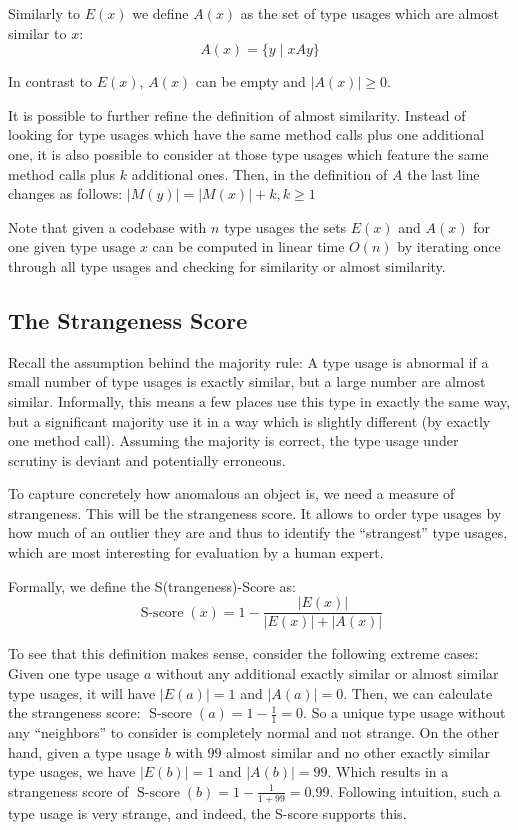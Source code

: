 Similarly to $E(x)$ we define $A(x)$ as the set of type usages which are almost similar to $x$:
\begin{equation*}
A(x) = \{y \mid xAy \}
\end{equation*}

In contrast to $E(x)$, $A(x)$ can be empty and $|A(x)|\geq0$.

It is possible to further refine the definition of almost similarity.
Instead of looking for type usages which have the same method calls plus one additional one, it is also possible to consider at those type usages which feature the same method calls plus $k$ additional ones.
Then, in the definition of $A$ the last line changes as follows: $|M(y)| = |M(x)| + k, k\geq1$

Note that given a codebase with $n$ type usages the sets $E(x)$ and $A(x)$ for one given type usage $x$ can be computed in linear time $O(n)$ by iterating once through all type usages and checking for similarity or almost similarity.

\subsection{The Strangeness Score}

Recall the assumption behind the majority rule: A type usage is abnormal if a small number of type usages is exactly similar, but a large number are almost similar.
Informally, this means a few places use this type in exactly the same way, but a significant majority use it in a way which is slightly different (by exactly one method call).
Assuming the majority is correct, the type usage under scrutiny is deviant and potentially erroneous.

To capture concretely how anomalous an object is, we need a measure of strangeness.
This will be the strangeness score.
It allows to order type usages by how much of an outlier they are and thus to identify the ``strangest'' type usages, which are most interesting for evaluation by a human expert.

Formally, we define the S(trangeness)-Score as:
\begin{equation*}
    \operatorname{S-score}(x) = 1 - \frac{|E(x)|}{|E(x)|+|A(x)|}
\end{equation*}

To see that this definition makes sense, consider the following extreme cases:
Given one type usage $a$ without any additional exactly similar or almost similar type usages, it will have $|E(a)| = 1$ and $|A(a)| = 0$.
Then, we can calculate the strangeness score: $\operatorname{S-score}(a) = 1-\frac{1}{1} = 0$.
So a unique type usage without any ``neighbors'' to consider is completely normal and not strange.
On the other hand, given a type usage $b$ with $99$ almost similar and no other exactly similar type usages, we have $|E(b)| = 1$ and $|A(b)| = 99$.
Which results in a strangeness score of $\operatorname{S-score}(b) = 1-\frac{1}{1+99} = 0.99$.
Following intuition, such a type usage is very strange, and indeed, the S-score supports this.


